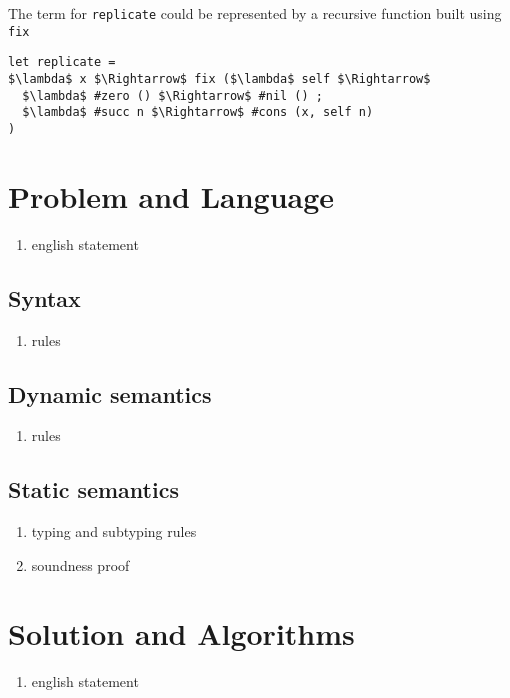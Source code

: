 \documentclass[sigplan,screen]{acmart}
\begin{document}
\hfill

\noindent The term for \lstinline{replicate} could be represented by a recursive function built using \lstinline{fix} 

\begin{lstlisting}[]
let replicate = 
$\lambda$ x $\Rightarrow$ fix ($\lambda$ self $\Rightarrow$
  $\lambda$ #zero () $\Rightarrow$ #nil () ;
  $\lambda$ #succ n $\Rightarrow$ #cons (x, self n)
) 
\end{lstlisting}



\section{Problem and Language}
\begin{enumerate}
  \item english statement 
\end{enumerate}
\subsection{Syntax}
\begin{enumerate}
  \item rules 
\end{enumerate}

\subsection{Dynamic semantics}
\begin{enumerate}
  \item rules 
\end{enumerate}

\subsection{Static semantics}
\begin{enumerate}
  \item typing and subtyping rules 
  \item soundness proof 
\end{enumerate}

\section{Solution and Algorithms}
\begin{enumerate}
  \item english statement 
\end{enumerate}
\end{document}
